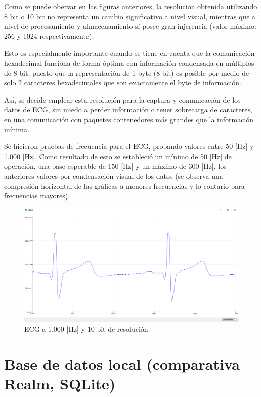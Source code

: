 \newpage

Como se puede obervar en las figuras anteriores, la resolución obtenida utilizando 8 bit o 10 bit no representa un cambio significativo a nivel visual, mientras que a nivel de procesamiento y almacenamiento sí posee gran injerencia (valor máximo: 256 y 1024 respectivamente). 

Esto es especialmente importante cuando se tiene en cuenta que la comunicación hexadecimal funciona de forma óptima con información condensada en múltiplos de 8 bit, puesto que la representación de 1 byte (8 bit) es posible por medio de solo 2 caracteres hexadecimales que son exactamente el byte de información.

Así, se decide emplear esta resolución para la captura y comunicación de los datos de ECG, sin miedo a perder información o tener sobrecarga de caracteres, en una comunicación con paquetes contenedores más grandes que la información mínima.

Se hicieron pruebas de frecuencia para el ECG, probando valores entre 50 [Hz] y 1.000 [Hz]. Como resultado de esto se estableció un mínimo de 50 [Hz] de operación, una base esperable de 150 [Hz] y un máximo de 300 [Hz], los anteriores valores por condensación visual de los datos (se observa una compresión horizontal de las gráficas a menores frecuencias y lo contario para frecuencias mayores).

\begin{figure}[H]
	\centering
	\includegraphics[scale=0.4]{figuras/proto2/1000hz.png}
	\caption{ECG a 1.000 [Hz] y 10 bit de resolución}
	\label{1000hz}
\end{figure}

\section{Base de datos local (comparativa Realm, SQLite) }


